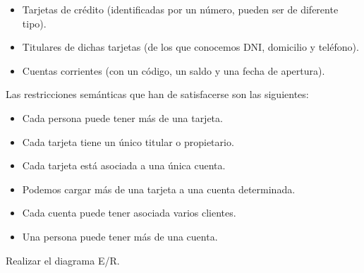 \begin{itemize}
    \item Tarjetas de crédito (identificadas por un número, pueden ser de diferente tipo).
    \item Titulares de dichas tarjetas (de los que conocemos DNI, domicilio y teléfono).
    \item Cuentas corrientes (con un código, un saldo y una fecha de apertura).
\end{itemize}

\noindent Las restricciones semánticas que han de satisfacerse son las siguientes: 

\begin{itemize}
    \item Cada persona puede tener más de una tarjeta.
    \item Cada tarjeta tiene un único titular o propietario.
    \item Cada tarjeta está asociada a una única cuenta.
    \item Podemos cargar más de una tarjeta a una cuenta determinada.
    \item Cada cuenta puede tener asociada varios clientes.
    \item Una persona puede tener más de una cuenta.
\end{itemize}

\noindent Realizar el diagrama E/R.

